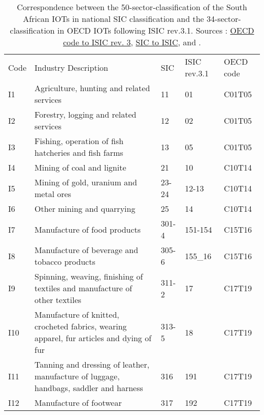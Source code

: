 \documentclass[12pt,english]{article}
\begin{document}
\clearpage
\begin{table}[ht]
	\centering
	\vspace{-36pt}\hspace{-10pt}\caption{\label{correspondance_OECD_ZA}Correspondence between the 50-sector-classification of the South African IOTs in national SIC classification and the 34-sector-classification in OECD IOTs following ISIC rev.3.1. Sources : \href{http://www.oecd.org/sti/ind/IOT_Industries_Items.pdf}{OECD code to ISIC rev. 3}, \href{https://www.statssa.gov.za/additional_services/sic/descrip6.htm}{SIC to ISIC}, \cite{IOT2014} and .}
	\vspace{8pt}%
	\begin{adjustbox}{width=\textwidth}
	\normalsize
		\begin{tabular}{lp{500pt}lll}
		\toprule
		Code & Industry Description & SIC & ISIC rev.3.1 & OECD code \\ \arrayrulecolor{black!30}\midrule
		I1 & Agriculture, hunting and related services & 11 & 01 & C01T05 \\ \midrule
		I2 & Forestry, logging and related services & 12 & 02 & C01T05 \\ \midrule
		I3 & Fishing, operation of fish hatcheries and fish farms & 13 & 05 & C01T05 \\ \midrule
		I4 & Mining of coal and lignite & 21 & 10 & C10T14 \\ \midrule
		I5 & Mining of gold, uranium and metal ores  & 23-24 & 12-13 & C10T14 \\ \midrule
		I6 & Other mining and quarrying & 25 & 14 & C10T14 \\ \midrule
		I7 & Manufacture of food products & 301-4 & 151-154 & C15T16 \\ \midrule
		I8 & Manufacture of beverage and tobacco products & 305-6 & 155\_16 & C15T16 \\ \midrule
		I9 & Spinning, weaving, finishing of textiles and manufacture of other textiles & 311-2 & 17 & C17T19 \\ \midrule
		I10 & Manufacture of knitted, crocheted fabrics, wearing apparel, fur articles and dying of fur & 313-5 & 18 & C17T19 \\ \midrule
		I11 & Tanning and dressing of leather, manufacture of luggage, handbags, saddler and harness & 316 & 191 & C17T19 \\ \midrule
		I12 & Manufacture of footwear & 317 & 192 & C17T19 \\ \midrule

\end{tabular}
\end{adjustbox}
\end{table}
\end{document}
